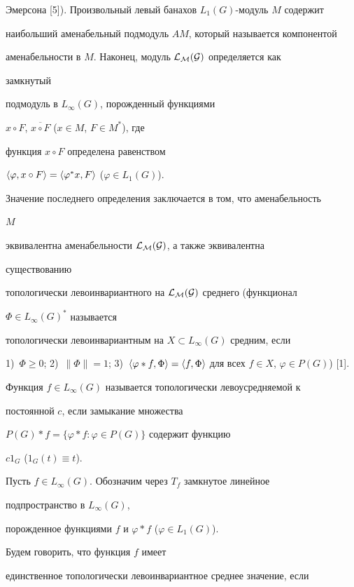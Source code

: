 Эмерсона [5]). Произвольный левый банахов $L_1(G)$-модуль $M$ содержит


наибольший аменабельный подмодуль $AM$, который называется компонентой


аменабельности в $M$. Наконец, модуль $\cal L_M(G)$ определяется как


замкнутый


подмодуль в $L_\infty(G)$, порожденный функциями


$x\circ F$, $\overline{x\circ F}$ ($x\in M$, $F\in M^*$), где


функция $x\circ F$ определена равенством


$\langle\varphi,x\circ F\rangle=\langle\varphi^*x,F\rangle$ ($\varphi\in L_1(G)$).





Значение последнего определения заключается в том, что аменабельность


$M$


эквивалентна аменабельности $\cal L_M(G)$, а также эквивалентна


существованию


топологически левоинвариантного на $\cal L_M(G)$ среднего (функционал


$\Phi\in L_\infty(G)^*$ называется


топологически левоинвариантным на $X\subset L_\infty(G)$ средним, если


1)~$\Phi\ge 0$; 2)~$\|\Phi\|=1$; 3)~$\la\varphi\ast f,\Phi\ra=\la


f,\Phi\ra$ для всех $f\in X$, $\varphi\in P(G)$) [1].





Функция $f\in L_\infty(G)$ называется топологически левоусредняемой к


постоянной $c$, если замыкание множества


$P(G)\ast f=\{\varphi\ast f:\varphi\in P(G)\}$ содержит функцию


$c1_G$ ($1_G(t)\equiv t$).





Пусть $f\in L_\infty(G)$. Обозначим через $T_f$ замкнутое линейное


подпространство в $L_\infty(G)$,


порожденное функциями $f$ и $\varphi\ast f$ ($\varphi\in L_1(G)$).


Будем говорить, что функция $f$ имеет


единственное топологически левоинвариантное среднее значение, если


